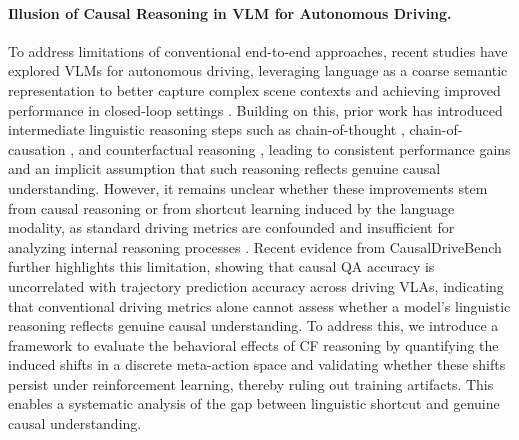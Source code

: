 \documentclass{article}
\begin{document}
\paragraph{Illusion of Causal Reasoning in VLM for Autonomous Driving.}

To address limitations of conventional end-to-end approaches, recent studies have explored VLMs for autonomous driving, leveraging language as a coarse semantic representation to better capture complex scene contexts and achieving improved performance in closed-loop settings \cite{causal:e2e-vlm:simlingo, e2e-vlm:orion, e2e-vlm:autovla}. Building on this, prior work has introduced intermediate linguistic reasoning steps such as chain-of-thought \cite{e2e-vlm:drivelm}, chain-of-causation \cite{causal:e2e-vlm:coc-vla}, and counterfactual reasoning \cite{causal:cf_vla}, leading to consistent performance gains and an implicit assumption that such reasoning reflects genuine causal understanding. However, it remains unclear whether these improvements stem from causal reasoning or from shortcut learning induced by the language modality, as standard driving metrics are confounded and insufficient for analyzing internal reasoning processes \cite{causal:e2e-vlm:more_than_meets_the_eye}. Recent evidence from CausalDriveBench \cite{causal:e2e-vlm:causaldrivebench} further highlights this limitation, showing that causal QA accuracy is uncorrelated with trajectory prediction accuracy across driving VLAs, indicating that conventional driving metrics alone cannot assess whether a model's linguistic reasoning reflects genuine causal understanding. To address this, we introduce a framework to evaluate the behavioral effects of CF reasoning by quantifying the induced shifts in a discrete meta-action space and validating whether these shifts persist under reinforcement learning, thereby ruling out training artifacts. This enables a systematic analysis of the gap between linguistic shortcut and genuine causal understanding.
\end{document}
